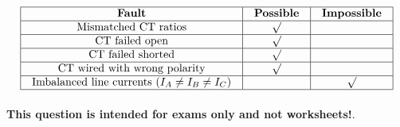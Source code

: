 $$\vbox{\offinterlineskip
\halign{\strut
\vrule \quad\hfil # \ \hfil & 
\vrule \quad\hfil # \ \hfil & 
\vrule \quad\hfil # \ \hfil \vrule \cr
\noalign{\hrule}
%
{\bf Fault} & {\bf Possible} & {\bf Impossible} \cr
%
\noalign{\hrule}
%
Mismatched CT ratios & $\surd$ &  \cr
%
\noalign{\hrule}
%
CT failed open & $\surd$ &  \cr
%
\noalign{\hrule}
%
CT failed shorted & $\surd$ &  \cr
%
\noalign{\hrule}
%
CT wired with wrong polarity & $\surd$ &  \cr
%
\noalign{\hrule}
%
Imbalanced line currents ($I_A \neq I_B \neq I_C$) &  & $\surd$ \cr
%
\noalign{\hrule}
} %
}$$ %







{\bf This question is intended for exams only and not worksheets!}.



